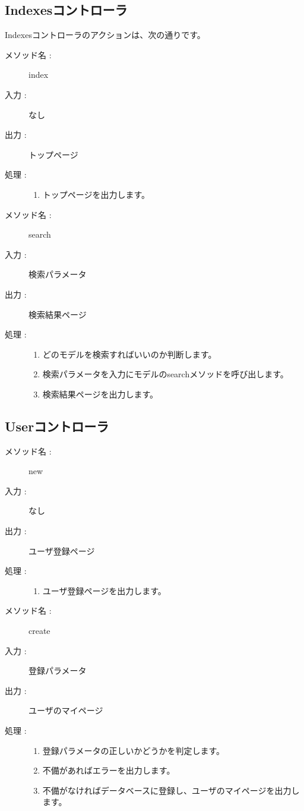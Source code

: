 \documentclass[a4j,titlepage]{jarticle}
\begin{document}
\subsection{Indexesコントローラ}
Indexesコントローラのアクションは、次の通りです。

\begin{description}
\item [メソッド名 :] index
\item [入力 :] なし
\item [出力 :] トップページ
\item [処理 :]\mbox{}
  \begin{enumerate}
  \item トップページを出力します。
  \end{enumerate}
\end{description}

\begin{description}
\item [メソッド名 :] search
\item [入力 :] 検索パラメータ
\item [出力 :] 検索結果ページ
\item [処理 :]\mbox{}
  \begin{enumerate}
  \item どのモデルを検索すればいいのか判断します。
  \item 検索パラメータを入力にモデルのsearchメソッドを呼び出します。
  \item 検索結果ページを出力します。
  \end{enumerate}
\end{description}

\subsection{Userコントローラ}
\begin{description}
\item [メソッド名 :] new
\item [入力 :] なし
\item [出力 :] ユーザ登録ページ
\item [処理 :]\mbox{}
  \begin{enumerate}
 \item ユーザ登録ページを出力します。
 \end{enumerate}
\end{description}

\begin{description}
\item [メソッド名 :] create
\item [入力 :] 登録パラメータ
\item [出力 :] ユーザのマイページ
\item [処理 :]\mbox{}
  \begin{enumerate}
  \item 登録パラメータの正しいかどうかを判定します。
  \item 不備があればエラーを出力します。
  \item 不備がなければデータベースに登録し、ユーザのマイページを出力します。
  \end{enumerate}
\end{description}
\end{document}

